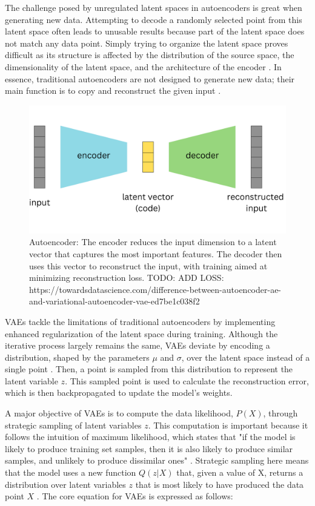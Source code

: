 The challenge posed by unregulated latent spaces in autoencoders is great when generating new data. Attempting to decode a randomly selected point from this latent space often leads to unusable results because part of the latent space does not match any data point. Simply trying to organize the latent space proves difficult as its structure is affected by the distribution of the source space, the dimensionality of the latent space, and the architecture of the encoder \citep{michelucci2022introduction}.
In essence, traditional autoencoders are not designed to generate new data; their main function is to copy and reconstruct the given input \citep{GoodfellowDeepLearning}.

\begin{figure}[ht]
    \centering
      \hspace{.8cm}
      \includegraphics[width=.7\columnwidth]{figures/Autoencoder.png}
      \caption{Autoencoder: The encoder reduces the input dimension to a latent vector that captures the most important features. The decoder then uses this vector to reconstruct the input, with training aimed at minimizing reconstruction loss. TODO: ADD LOSS: https://towardsdatascience.com/difference-between-autoencoder-ae-and-variational-autoencoder-vae-ed7be1c038f2}
      \label{fig:figureAE}
\end{figure}

VAEs tackle the limitations of traditional autoencoders by implementing enhanced regularization of the latent space during training. Although the iterative process largely remains the same, VAEs deviate by encoding a distribution, shaped by the parameters \(\mu\) and \(\sigma\), over the latent space instead of a single point \citep{doerschVAE}. Then, a point is sampled from this distribution to represent the latent variable \(z\). This sampled point is used to calculate the reconstruction error, which is then backpropagated to update the model's weights.

A major objective of VAEs is to compute the data likelihood, \(P(X)\), through strategic sampling of latent variables \(z\). This computation is important because it follows the intuition of maximum likelihood, which states that "if the model is likely to produce training set samples, then it is also likely to produce similar samples, and unlikely to produce dissimilar ones" \citep{doerschVAE}. Strategic sampling here means that the model uses a new function \(Q(z|X)\) that, given a value of X, returns a distribution over latent variables \(z\) that is most likely to have produced the data point \(X\) \citep{doerschVAE}. The core equation for VAEs is expressed as follows:

